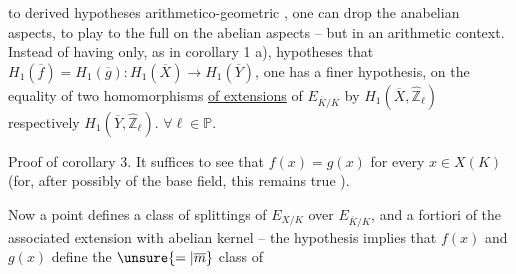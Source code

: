  to derived hypotheses arithmetico-geometric , one can drop the anabelian aspects, to play to the full on the abelian aspects -- but in an arithmetic context. Instead of having  only, as in corollary 1 a), hypotheses that $H_1(\overline f)=H_1(\overline g):H_1(\overline X)\longrightarrow H_1(\overline Y)$, one has a finer hypothesis, on the equality of two homomorphisms \uline{of extensions} of $E_{\overline K/K}$ by $H_1(\overline X,\widehat{\mathbb Z}_\ell)$ respectively $H_1(\overline Y,\widehat{\mathbb Z}_\ell)$. $\forall\ell\in\mathbb P$.

Proof of corollary 3.
It suffices to see that $f(x)=g(x)$ for every $x\in X(K)$ (for, after possibly   of the base field, this remains true  ). 

Now a point defines a  class of  splittings of $E_{X/K}$ over $E_{\overline K/K}$, and a fortiori of the associated extension with abelian kernel -- the hypothesis implies that $f(x)$ and $g(x)$ define the $\unsure{=|\overline m}$ class of
